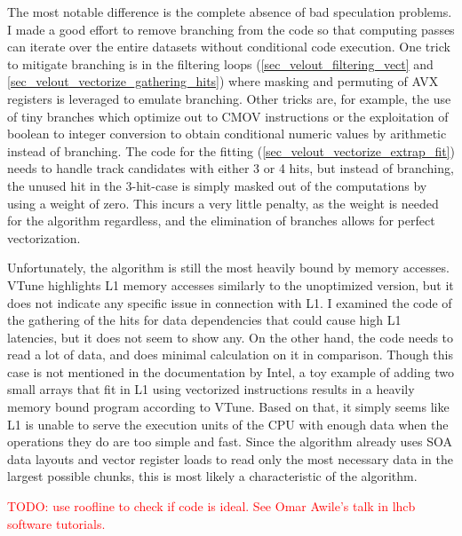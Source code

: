 \documentclass[12pt]{article}
\begin{document}
The most notable difference is the complete absence of bad speculation problems. I made a good effort to remove branching from the code so that computing passes can iterate over the entire datasets without conditional code execution. One trick to mitigate branching is in the filtering loops (\ref{sec_velout_filtering_vect} and \ref{sec_velout_vectorize_gathering_hits}) where masking and permuting of AVX registers is leveraged to emulate branching. Other tricks are, for example, the use of tiny branches which optimize out to CMOV instructions or the exploitation of boolean to integer conversion to obtain conditional numeric values by arithmetic instead of branching. The code for the fitting (\ref{sec_velout_vectorize_extrap_fit}) needs to handle track candidates with either 3 or 4 hits, but instead of branching, the unused hit in the 3-hit-case is simply masked out of the computations by using a weight of zero. This incurs a very little penalty, as the weight is needed for the algorithm regardless, and the elimination of branches allows for perfect vectorization.

\vspace{1pc}

Unfortunately, the algorithm is still the most heavily bound by memory accesses. VTune highlights L1 memory accesses similarly to the unoptimized version, but it does not indicate any specific issue in connection with L1. I examined the code of the gathering of the hits for data dependencies that could cause high L1 latencies, but it does not seem to show any. On the other hand, the code needs to read a lot of data, and does minimal calculation on it in comparison. Though this case is not mentioned in the documentation by Intel, a toy example of adding two small arrays that fit in L1 using vectorized instructions results in a heavily memory bound program according to VTune. Based on that, it simply seems like L1 is unable to serve the execution units of the CPU with enough data when the operations they do are too simple and fast. Since the algorithm already uses SOA data layouts and vector register loads to read only the most necessary data in the largest possible chunks, this is most likely a characteristic of the algorithm.

\textcolor{red}{TODO: use roofline to check if code is ideal. See Omar Awile's talk in lhcb software tutorials.}

\vspace{1pc}
\end{document}
